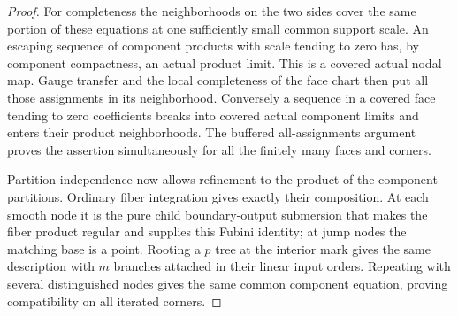 \begin{proof}
For completeness the neighborhoods on the two sides cover the same
portion of these equations at one sufficiently small common support
scale.  An escaping sequence of component products with scale tending
to zero has, by component compactness, an actual product limit.  This
is a covered actual nodal map.  Gauge transfer and the local completeness
of the face chart then put all those assignments in its neighborhood.
Conversely a sequence in a covered face tending to zero coefficients
breaks into covered actual component limits and enters their product
neighborhoods.  The buffered all-assignments argument proves the
assertion simultaneously for all the finitely many faces and corners.

Partition independence now allows refinement to the product of the
component partitions.  Ordinary fiber integration gives exactly their
composition.  At each smooth node it is the pure child boundary-output
submersion that makes the fiber product regular and supplies this Fubini
identity; at jump nodes the matching base is a point.  Rooting a $p$
tree at the interior mark gives the same description with $m$ branches
attached in their linear input orders.  Repeating with several
distinguished nodes gives the same common component equation, proving
compatibility on all iterated corners.
\end{proof}

